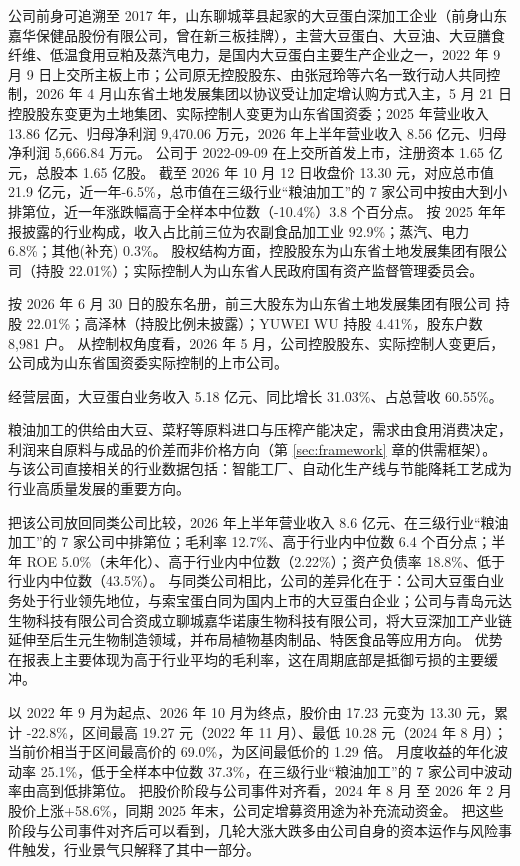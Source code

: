  公司前身可追溯至 2017 年，山东聊城莘县起家的大豆蛋白深加工企业（前身山东嘉华保健品股份有限公司，曾在新三板挂牌），主营大豆蛋白、大豆油、大豆膳食纤维、低温食用豆粕及蒸汽电力，是国内大豆蛋白主要生产企业之一，2022 年 9 月 9 日上交所主板上市；公司原无控股股东、由张冠玲等六名一致行动人共同控制，2026 年 4 月山东省土地发展集团以协议受让加定增认购方式入主，5 月 21 日控股股东变更为土地集团、实际控制人变更为山东省国资委；2025 年营业收入 13.86 亿元、归母净利润 9,470.06 万元，2026 年上半年营业收入 8.56 亿元、归母净利润 5,666.84 万元。 公司于 2022-09-09 在上交所首发上市，注册资本 1.65 亿元，总股本 1.65 亿股。 截至 2026 年 10 月 12 日收盘价 13.30 元，对应总市值 21.9 亿元，近一年-6.5\%，总市值在三级行业“粮油加工”的 7 家公司中按由大到小排第位，近一年涨跌幅高于全样本中位数（-10.4\%）3.8 个百分点。 按 2025 年年报披露的行业构成，收入占比前三位为农副食品加工业 92.9\%；蒸汽、电力 6.8\%；其他(补充) 0.3\%。 股权结构方面，控股股东为山东省土地发展集团有限公司（持股 22.01\%）；实际控制人为山东省人民政府国有资产监督管理委员会。

 按 2026 年 6 月 30 日的股东名册，前三大股东为山东省土地发展集团有限公司 持股 22.01\%；高泽林（持股比例未披露）；YUWEI WU 持股 4.41\%，股东户数 8,981 户。 从控制权角度看，2026 年 5 月，公司控股股东、实际控制人变更后，公司成为山东省国资委实际控制的上市公司。

 经营层面，大豆蛋白业务收入 5.18 亿元、同比增长 31.03\%、占总营收 60.55\%。

 粮油加工的供给由大豆、菜籽等原料进口与压榨产能决定，需求由食用消费决定，利润来自原料与成品的价差而非价格方向（第 \ref{sec:framework} 章的供需框架）。 与该公司直接相关的行业数据包括：智能工厂、自动化生产线与节能降耗工艺成为行业高质量发展的重要方向。

 把该公司放回同类公司比较，2026 年上半年营业收入 8.6 亿元、在三级行业“粮油加工”的 7 家公司中排第位；毛利率 12.7\%、高于行业内中位数 6.4 个百分点；半年 ROE 5.0\%（未年化）、高于行业内中位数（2.22\%）；资产负债率 18.8\%、低于行业内中位数（43.5\%）。 与同类公司相比，公司的差异化在于：公司大豆蛋白业务处于行业领先地位，与索宝蛋白同为国内上市的大豆蛋白企业；公司与青岛元达生物科技有限公司合资成立聊城嘉华诺康生物科技有限公司，将大豆深加工产业链延伸至后生元生物制造领域，并布局植物基肉制品、特医食品等应用方向。 优势在报表上主要体现为高于行业平均的毛利率，这在周期底部是抵御亏损的主要缓冲。

 以 2022 年 9 月为起点、2026 年 10 月为终点，股价由 17.23 元变为 13.30 元，累计 -22.8\%，区间最高 19.27 元（2022 年 11 月）、最低 10.28 元（2024 年 8 月）；当前价相当于区间最高价的 69.0\%，为区间最低价的 1.29 倍。 月度收益的年化波动率 25.1\%，低于全样本中位数 37.3\%，在三级行业“粮油加工”的 7 家公司中波动率由高到低排第位。 把股价阶段与公司事件对齐看，2024 年 8 月 至 2026 年 2 月股价上涨+58.6\%，同期 2025 年末，公司定增募资用途为补充流动资金。 把这些阶段与公司事件对齐后可以看到，几轮大涨大跌多由公司自身的资本运作与风险事件触发，行业景气只解释了其中一部分。

